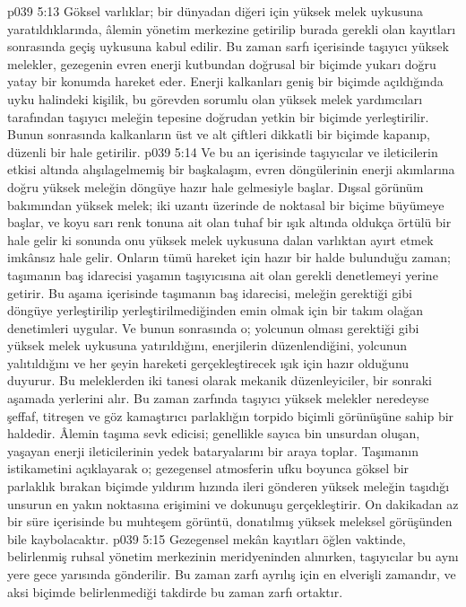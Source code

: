 \vs p039 5:13 Göksel varlıklar; bir dünyadan diğeri için yüksek melek uykusuna yaratıldıklarında, âlemin yönetim merkezine getirilip burada gerekli olan kayıtları sonrasında geçiş uykusuna kabul edilir. Bu zaman sarfı içerisinde taşıyıcı yüksek melekler, gezegenin evren enerji kutbundan doğrusal bir biçimde yukarı doğru yatay bir konumda hareket eder. Enerji kalkanları geniş bir biçimde açıldığında uyku halindeki kişilik, bu görevden sorumlu olan yüksek melek yardımcıları tarafından taşıyıcı meleğin tepesine doğrudan yetkin bir biçimde yerleştirilir. Bunun sonrasında kalkanların üst ve alt çiftleri dikkatli bir biçimde kapanıp, düzenli bir hale getirilir.
\vs p039 5:14 Ve bu an içerisinde taşıyıcılar ve ileticilerin etkisi altında alışılagelmemiş bir başkalaşım, evren döngülerinin enerji akımlarına doğru yüksek meleğin döngüye hazır hale gelmesiyle başlar. Dışsal görünüm bakımından yüksek melek; iki uzantı üzerinde de noktasal bir biçime büyümeye başlar, ve koyu sarı renk tonuna ait olan tuhaf bir ışık altında oldukça örtülü bir hale gelir ki sonunda onu yüksek melek uykusuna dalan varlıktan ayırt etmek imkânsız hale gelir. Onların tümü hareket için hazır bir halde bulunduğu zaman; taşımanın baş idarecisi yaşamın taşıyıcısına ait olan gerekli denetlemeyi yerine getirir. Bu aşama içerisinde taşımanın baş idarecisi, meleğin gerektiği gibi döngüye yerleştirilip yerleştirilmediğinden emin olmak için bir takım olağan denetimleri uygular. Ve bunun sonrasında o; yolcunun olması gerektiği gibi yüksek melek uykusuna yatırıldığını, enerjilerin düzenlendiğini, yolcunun yalıtıldığını ve her şeyin hareketi gerçekleştirecek ışık için hazır olduğunu duyurur. Bu meleklerden iki tanesi olarak mekanik düzenleyiciler, bir sonraki aşamada yerlerini alır. Bu zaman zarfında taşıyıcı yüksek melekler neredeyse şeffaf, titreşen ve göz kamaştırıcı parlaklığın torpido biçimli görünüşüne sahip bir haldedir. Âlemin taşıma sevk edicisi; genellikle sayıca bin unsurdan oluşan, yaşayan enerji ileticilerinin yedek bataryalarını bir araya toplar. Taşımanın istikametini açıklayarak o; gezegensel atmosferin ufku boyunca göksel bir parlaklık bırakan biçimde yıldırım hızında ileri gönderen yüksek meleğin taşıdığı unsurun en yakın noktasına erişimini ve dokunuşu gerçekleştirir. On dakikadan az bir süre içerisinde bu muhteşem görüntü, donatılmış yüksek meleksel görüşünden bile kaybolacaktır.
\vs p039 5:15 Gezegensel mekân kayıtları öğlen vaktinde, belirlenmiş ruhsal yönetim merkezinin meridyeninden alınırken, taşıyıcılar bu aynı yere gece yarısında gönderilir. Bu zaman zarfı ayrılış için en elverişli zamandır, ve aksi biçimde belirlenmediği takdirde bu zaman zarfı ortaktır.
